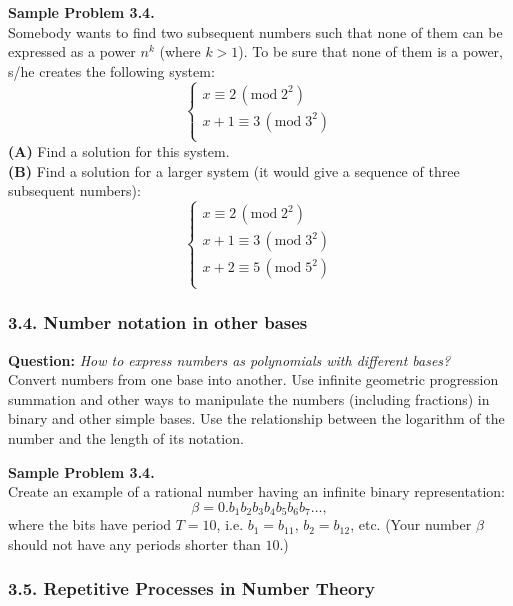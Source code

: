 \documentclass[jou]{apa6}
\begin{document}
\vspace{6pt}
{\bf Sample Problem 3.4.}\\
Somebody wants to find two subsequent numbers such that 
none of them can be expressed as a power $n^k$ (where $k>1$). 
To be sure that none of them is a power, s/he creates the following system: 
$$\left\{ \begin{array}{l} 
x \equiv 2\,(\text{mod}\;2^2)\\
x+1 \equiv 3\,(\text{mod}\;3^2)\\
\end{array} \right.$$
{\bf (A)} Find a solution for this system.\\
{\bf (B)} Find a solution for a larger system (it would give a sequence of three
subsequent numbers): 
$$\left\{ \begin{array}{l} 
x \equiv 2\,(\text{mod}\;2^2)\\
x+1 \equiv 3\,(\text{mod}\;3^2)\\
x+2 \equiv 5\,(\text{mod}\;5^2)\\
\end{array} \right.$$



\subsubsection{3.4. Number notation in other bases}

{\bf Question:} {\em How to express numbers as polynomials with different bases?}\\
{\scriptsize 
Convert numbers from one base into another. Use infinite geometric progression 
summation and other ways to manipulate the numbers (including fractions) 
in binary and other simple bases. Use the relationship between 
the logarithm of the number and the length of its notation.
}

\vspace{6pt}
{\bf Sample Problem 3.4.}\\
Create an example of a rational number having an infinite binary representation: 
$$\beta = 0.b_1b_2b_3b_4b_5b_6b_7\ldots,$$
where the bits have period $T = 10$, i.e. $b_1 = b_{11}$, $b_2 = b_{12}$, etc. 
(Your number $\beta$ should not have any periods shorter than $10$.)



\subsubsection{3.5. Repetitive Processes in Number Theory} 
\end{document}
